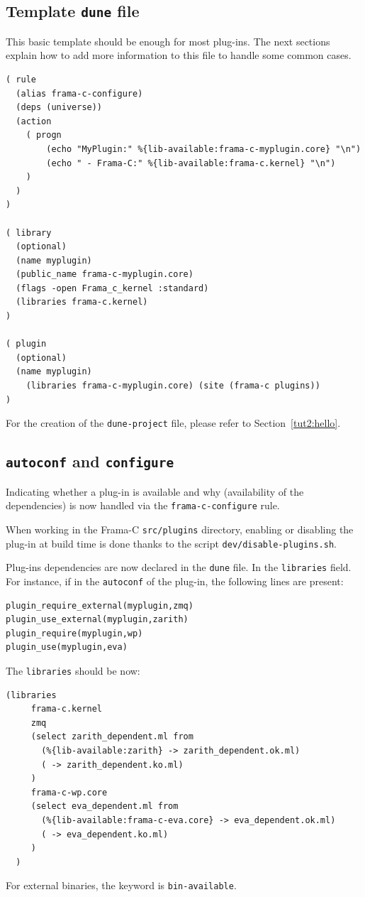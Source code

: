 \subsection{Template \texttt{dune} file}

This basic template should be enough for most plug-ins. The next sections
explain how to add more information to this file to handle some common cases.

\begin{lstlisting}[language=Dune]
( rule
  (alias frama-c-configure)
  (deps (universe))
  (action
    ( progn
        (echo "MyPlugin:" %{lib-available:frama-c-myplugin.core} "\n")
        (echo " - Frama-C:" %{lib-available:frama-c.kernel} "\n")
    )
  )
)

( library
  (optional)
  (name myplugin)
  (public_name frama-c-myplugin.core)
  (flags -open Frama_c_kernel :standard)
  (libraries frama-c.kernel)
)

( plugin
  (optional)
  (name myplugin)
    (libraries frama-c-myplugin.core) (site (frama-c plugins))
)
\end{lstlisting}

For the creation of the \texttt{dune-project} file, please refer to
Section~\ref{tut2:hello}.

\subsection{\texttt{autoconf} and \texttt{configure}}\label{adv:dune-migration:conf}

Indicating whether a plug-in is available and why (availability of the
dependencies) is now handled via the \texttt{frama-c-configure} rule.

When working in the Frama-C \texttt{src/plugins} directory, enabling or
disabling the plug-in at build time is done thanks to the script
\texttt{dev/disable-plugins.sh}.

Plug-ins dependencies are now declared in the \texttt{dune} file. In the
\texttt{libraries} field. For instance, if in the \texttt{autoconf} of the
plug-in, the following lines are present:

\begin{lstlisting}
plugin_require_external(myplugin,zmq)
plugin_use_external(myplugin,zarith)
plugin_require(myplugin,wp)
plugin_use(myplugin,eva)
\end{lstlisting}

The \texttt{libraries} should be now:
\begin{lstlisting}[language=Dune]
  (libraries
     frama-c.kernel
     zmq
     (select zarith_dependent.ml from
       (%{lib-available:zarith} -> zarith_dependent.ok.ml)
       ( -> zarith_dependent.ko.ml)
     )
     frama-c-wp.core
     (select eva_dependent.ml from
       (%{lib-available:frama-c-eva.core} -> eva_dependent.ok.ml)
       ( -> eva_dependent.ko.ml)
     )
  )
\end{lstlisting}
For external binaries, the keyword is \texttt{bin-available}.

